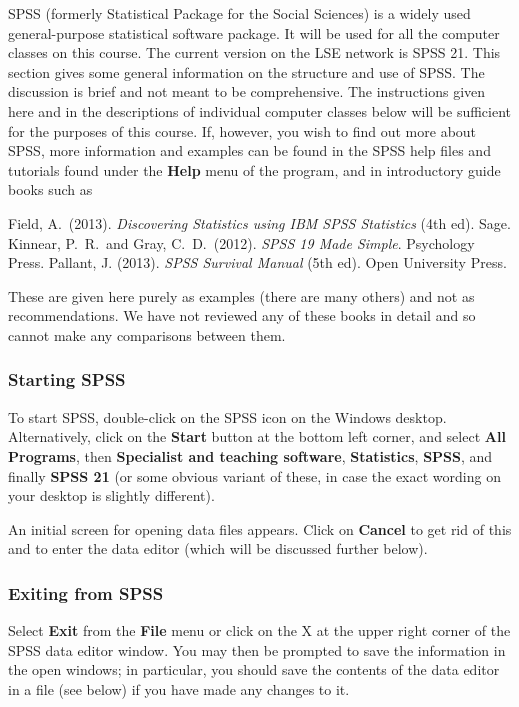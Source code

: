 \documentclass[11pt,a4paper,openany]{book}
\begin{document}
SPSS (formerly Statistical Package for the Social Sciences) is a widely
used general-purpose statistical software package. It will be used for
all the computer classes on this course. The current version on the LSE
network is SPSS 21. This section gives some general information on the
structure and use of SPSS. The discussion is brief and not meant to be
comprehensive. The instructions given here and in the descriptions of
individual computer classes below will be sufficient for the purposes of
this course. If, however, you wish to find out more about SPSS, more
information and examples can be found in the SPSS help files and
tutorials found under the \textbf{Help} menu of the program, and in
introductory guide books such as

Field, A.~(2013). \emph{Discovering Statistics using IBM SPSS
Statistics} (4th ed). Sage. Kinnear, P.~R.~and Gray, C.~D.~(2012).
\emph{SPSS 19 Made Simple}. Psychology Press. Pallant, J. (2013).
\emph{SPSS Survival Manual} (5th ed). Open University Press.

These are given here purely as examples (there are many others) and not
as recommendations. We have not reviewed any of these books in detail
and so cannot make any comparisons between them.

\subsubsection*{Starting SPSS}\label{starting-spss}

To start SPSS, double-click on the SPSS icon on the Windows desktop.
Alternatively, click on the \textbf{Start} button at the bottom left
corner, and select \textbf{All Programs}, then \textbf{Specialist and
teaching software}, \textbf{Statistics}, \textbf{SPSS}, and finally
\textbf{SPSS 21} (or some obvious variant of these, in case the exact
wording on your desktop is slightly different).

An initial screen for opening data files appears. Click on
\textbf{Cancel} to get rid of this and to enter the data editor (which
will be discussed further below).

\subsubsection*{Exiting from SPSS}\label{exiting-from-spss}

Select \textbf{Exit} from the \textbf{File} menu or click on the X at
the upper right corner of the SPSS data editor window. You may then be
prompted to save the information in the open windows; in particular, you
should save the contents of the data editor in a file (see below) if you
have made any changes to it.
\end{document}

